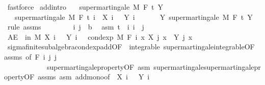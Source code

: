 \begin{isabellebody}
\ fastforce%
\endisatagproof
{\isafoldproof}%
%
\isadelimproof
\isanewline
%
\endisadelimproof
\isanewline
{}\isamarkupfalse%
\ add{\isacharbrackleft}{\kern0pt}intro{\isacharbrackright}{\kern0pt}{\isacharcolon}{\kern0pt}\isanewline
\ \ \ {\isachardoublequoteopen}supermartingale\ M\ F\ t\ Y{\isachardoublequoteclose}\isanewline
\ \ \ {\isachardoublequoteopen}supermartingale\ M\ F\ t\ {\isacharparenleft}{\kern0pt}{\isasymlambda}i\ {\isasymxi}{\isachardot}{\kern0pt}\ X\ i\ {\isasymxi}\ {\isacharplus}{\kern0pt}\ Y\ i\ {\isasymxi}{\isacharparenright}{\kern0pt}{\isachardoublequoteclose}\isanewline
%
\isadelimproof
%
\endisadelimproof
%
\isatagproof
{}\isamarkupfalse%
\ {\isacharminus}{\kern0pt}\isanewline
\ \ \isamarkupfalse%
\ Y{\isacharcolon}{\kern0pt}\ supermartingale\ M\ F\ t\ Y\ \isamarkupfalse%
\ {\isacharparenleft}{\kern0pt}rule\ assms{\isacharparenright}{\kern0pt}\isanewline
\ \ \isacommand{{\isacharbraceleft}{\kern0pt}}\isamarkupfalse%
\isanewline
\ \ \ \ \isamarkupfalse%
\ i\ j\ {\isacharcolon}{\kern0pt}{\isacharcolon}{\kern0pt}\ {\isacharprime}{\kern0pt}b\ \isamarkupfalse%
\ asm{\isacharcolon}{\kern0pt}\ {\isachardoublequoteopen}t\ {\isasymle}\ i{\isachardoublequoteclose}\ {\isachardoublequoteopen}i\ {\isasymle}\ j{\isachardoublequoteclose}\isanewline
\ \ \ \ \isamarkupfalse%
\ {\isachardoublequoteopen}AE\ {\isasymxi}\ in\ M{\isachardot}{\kern0pt}\ X\ i\ {\isasymxi}\ {\isacharplus}{\kern0pt}\ Y\ i\ {\isasymxi}\ {\isasymge}\ cond{\isacharunderscore}{\kern0pt}exp\ M\ {\isacharparenleft}{\kern0pt}F\ i{\isacharparenright}{\kern0pt}\ {\isacharparenleft}{\kern0pt}{\isasymlambda}x{\isachardot}{\kern0pt}\ X\ j\ x\ {\isacharplus}{\kern0pt}\ Y\ j\ x{\isacharparenright}{\kern0pt}\ {\isasymxi}{\isachardoublequoteclose}\ \isanewline
\ \ \ \ \ \ \isamarkupfalse%
\ sigma{\isacharunderscore}{\kern0pt}finite{\isacharunderscore}{\kern0pt}subalgebra{\isachardot}{\kern0pt}cond{\isacharunderscore}{\kern0pt}exp{\isacharunderscore}{\kern0pt}add{\isacharbrackleft}{\kern0pt}OF\ {\isacharunderscore}{\kern0pt}\ integrable\ supermartingale{\isachardot}{\kern0pt}integrable{\isacharbrackleft}{\kern0pt}OF\ assms{\isacharbrackright}{\kern0pt}{\isacharcomma}{\kern0pt}\ of\ {\isachardoublequoteopen}F\ i{\isachardoublequoteclose}\ j\ j{\isacharbrackright}{\kern0pt}\ \isanewline
\ \ \ \ \ \ \ \ \ \ \ \ supermartingale{\isacharunderscore}{\kern0pt}property{\isacharbrackleft}{\kern0pt}OF\ asm{\isacharbrackright}{\kern0pt}\ supermartingale{\isachardot}{\kern0pt}supermartingale{\isacharunderscore}{\kern0pt}property{\isacharbrackleft}{\kern0pt}OF\ assms\ asm{\isacharbrackright}{\kern0pt}\ add{\isacharunderscore}{\kern0pt}mono{\isacharbrackleft}{\kern0pt}of\ {\isacharunderscore}{\kern0pt}\ {\isachardoublequoteopen}X\ i\ {\isacharunderscore}{\kern0pt}{\isachardoublequoteclose}\ {\isacharunderscore}{\kern0pt}\ {\isachardoublequoteopen}Y\ i\ {\isacharunderscore}{\kern0pt}{\isachardoublequoteclose}{\isacharbrackright}{\kern0pt}\ \isamarkupfalse%

\end{isabellebody}
